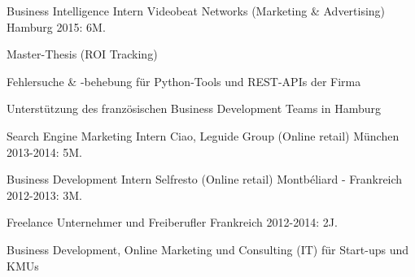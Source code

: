 \begin{cventries}
	\cventry
		{Business Intelligence Intern} %
		{Videobeat Networks (Marketing \& Advertising)} %
		{Hamburg} %
		{2015: 6M.} %
		{
		\begin{cvitems} %
			\item {Master-Thesis (ROI Tracking)}
			\item {Fehlersuche \& -behebung für Python-Tools und REST-APIs der Firma}
			\item {Unterstützung des französischen Business Development Teams in Hamburg}
		\end{cvitems}
		}

	\cventry
		{Search Engine Marketing Intern} %
		{Ciao, Leguide Group (Online retail)} %
		{München} %
		{2013-2014: 5M.} %
		{
		}

	\cventry
		{Business Development Intern} %
		{Selfresto (Online retail)} %
		{Montbéliard - Frankreich} %
		{2012-2013: 3M.} %
		{
		}

	\cventry
		{Freelance} %
		{Unternehmer und Freiberufler} %
		{Frankreich} %
		{2012-2014: 2J.} %
		{	
		\begin{cvitems} %
			\item{Business Development, Online Marketing und Consulting (IT) für Start-ups und KMUs}
		\end{cvitems}
		}
\end{cventries}
